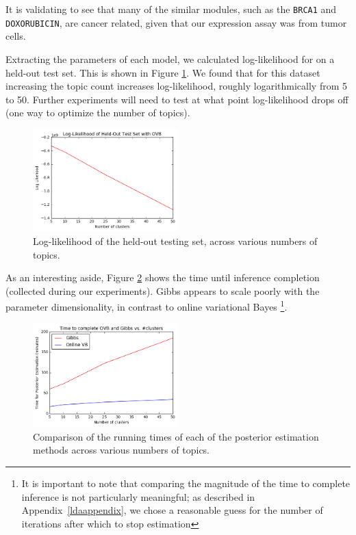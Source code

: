 \documentclass{article}
\begin{document}
It is validating to see that many of the similar modules, such as the \texttt{BRCA1} and \texttt{DOXORUBICIN}, are cancer related, given that our expression assay was from tumor cells.

Extracting the parameters of each model, we calculated log-likelihood for on a held-out test set. This is shown in Figure \ref{fig:ll}. We found that for this dataset increasing the topic count increases log-likelihood, roughly logarithmically from 5 to 50. Further experiments will need to test at what point log-likelihood drops off (one way to optimize the number of topics).

\begin{figure}
\vskip 0.2in
    \centering
    \includegraphics[width=0.5\textwidth]{figs/ll}
    \caption{Log-likelihood of the held-out testing set, across various numbers of topics.}
    \label{fig:ll}
\vskip -0.2in
\end{figure}


As an interesting aside, Figure \ref{fig:time} shows the time until inference completion (collected during our experiments). Gibbs appears to scale poorly with the parameter dimensionality, in contrast to online variational Bayes \footnote{It is important to note that comparing the magnitude of the time to complete inference is not particularly meaningful; as described in Appendix~\ref{ldaappendix}, we chose a reasonable guess for the number of iterations after which to stop estimation}. 

\begin{figure}
    \centering
    \includegraphics[width=0.5\textwidth]{figs/time}
    \caption{Comparison of the running times of each of the posterior estimation methods across various numbers of topics.}
    \label{fig:time}
\end{figure}
\end{document}
